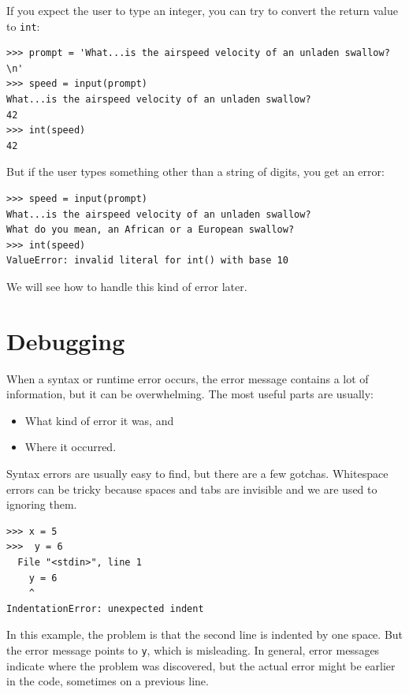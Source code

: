 \documentclass[10pt]{book}
\begin{document}
If you expect the user to type an integer, you can try to convert
the return value to {\tt int}:

\begin{verbatim}
>>> prompt = 'What...is the airspeed velocity of an unladen swallow?\n'
>>> speed = input(prompt)
What...is the airspeed velocity of an unladen swallow?
42
>>> int(speed)
42
\end{verbatim}
%
But if the user types something other than a string of digits,
you get an error:

\begin{verbatim}
>>> speed = input(prompt)
What...is the airspeed velocity of an unladen swallow?
What do you mean, an African or a European swallow?
>>> int(speed)
ValueError: invalid literal for int() with base 10
\end{verbatim}
%
We will see how to handle this kind of error later.


\section{Debugging}
\label{whitespace}

When a syntax or runtime error occurs, the error message contains
a lot of information, but it can be overwhelming.  The most
useful parts are usually:

\begin{itemize}

\item What kind of error it was, and

\item Where it occurred.

\end{itemize}

Syntax errors are usually easy to find, but there are a few
gotchas.  Whitespace errors can be tricky because spaces and
tabs are invisible and we are used to ignoring them.

\begin{verbatim}
>>> x = 5
>>>  y = 6
  File "<stdin>", line 1
    y = 6
    ^
IndentationError: unexpected indent
\end{verbatim}
%
In this example, the problem is that the second line is indented by
one space.  But the error message points to {\tt y}, which is
misleading.  In general, error messages indicate where the problem was
discovered, but the actual error might be earlier in the code,
sometimes on a previous line.
\end{document}
